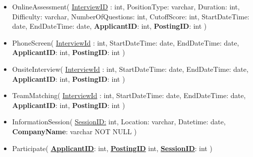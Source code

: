 \begin{itemize}
  \item OnlineAssessment(
      \underline{InterviewID} : int,
      PositionType: varchar,
      Duration: int,
      Difficulty: varchar,
      NumberOfQuestions: int,
      CutoffScore: int,
      StartDateTime: date,
      EndDateTime: date,
      \textbf{ApplicantID}: int,
      \textbf{PostingID}: int
    )

  \item PhoneScreen(
      \underline{InterviewId} : int,
      StartDateTime: date,
      EndDateTime: date,
      \textbf{ApplicantID}: int,
      \textbf{PostingID}: int
    )

  \item OnsiteInterview(
      \underline{InterviewId} : int,
      StartDateTime: date,
      EndDateTime: date,
      \textbf{ApplicantID}: int,
      \textbf{PostingID}: int
    )
    
  \item TeamMatching(
      \underline{InterviewId} : int,
      StartDateTime: date,
      EndDateTime: date,
      \textbf{ApplicantID}: int,
      \textbf{PostingID}: int
    )

  \item InformationSession(
      \underline{SessionID:}  int,
      Location: varchar,
      Datetime: date,
      \textbf{CompanyName}: varchar NOT NULL
    )

  \item Participate(
      \underline{\textbf{ApplicantID}}: int,
      \underline{\textbf{PostingID}}  int,
      \underline{\textbf{SessionID}}: int
    )

\end{itemize}
